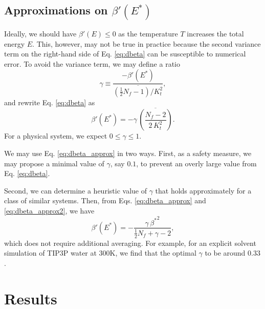 \documentclass[reprint]{revtex4-1}
\begin{document}
\subsection{Approximations on $\beta'(E^*)$}


Ideally, we should have $\beta'(E) \le 0$
as the temperature $T$ increases the total energy $E$.
%
This, however, may not be true in practice
because the second variance term on the right-hand side
of Eq. \eqref{eq:dbeta}
can be susceptible to numerical error.
%
%
To avoid the variance term,
we may define a ratio
%
\begin{equation}
  \gamma
  \equiv
  \frac
  {
    -\beta'(E^*)
  }
  {
    \overline{
      \left( \frac 1 2 N_f - 1  \right) / K_t^2
    }
  }
  ,
  \label{eq:gamma_def}
\end{equation}
%
and rewrite Eq. \eqref{eq:dbeta} as
%
\begin{equation}
  \beta'(E^*)
  =
  -\gamma \, \overline{
    \left(
      \frac{ N_f - 2 }
           { 2 \, K_t^2 }
    \right)
    }
  .
  \label{eq:dbeta_approx}
\end{equation}
%
For a physical system, we expect $0 \le \gamma \le 1$.

We may use Eq. \eqref{eq:dbeta_approx} in two ways.
%
First, as a safety measure,
we may propose a minimal value of $\gamma$, say $0.1$,
to prevent an overly large value from Eq. \eqref{eq:dbeta}.

Second,
we can determine a heuristic value of $\gamma$
that holds approximately for a class of similar systems.
%
Then,
from Eqs. \eqref{eq:dbeta_approx} and \eqref{eq:dbeta_approx2},
we have
%
\begin{equation}
  \beta'(E^*)
  =
  -\frac{ \gamma \, {\beta^*}^2 }
  { \frac{1}{2} N_f + \gamma - 2 }
  ,
  \label{eq:dbeta_approx2}
\end{equation}
%
which does not require additional averaging.
%
For example,
for an explicit solvent simulation of TIP3P water\cite{jorgensen1983}
at 300K, we find that the optimal $\gamma$
to be around $0.33$.



\section{Results}
\end{document}
